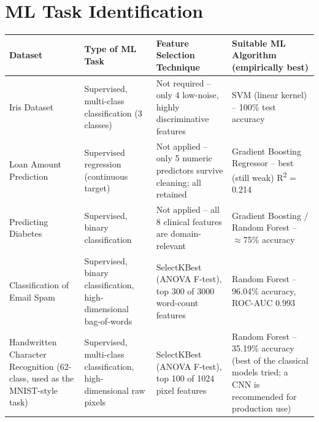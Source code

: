 \documentclass[12pt,a4paper]{article}
\begin{document}
\section{ML Task Identification}
 
\begingroup
\small
\begin{longtable}{|p{2.7cm}|p{2.3cm}|p{3.6cm}|p{3.9cm}|}
\hline
\textbf{Dataset} & \textbf{Type of ML Task} & \textbf{Feature Selection Technique} & \textbf{Suitable ML Algorithm (empirically best)} \\
\hline
\endhead
Iris Dataset & Supervised, multi-class classification (3 classes) & Not required -- only 4 low-noise, highly discriminative features & SVM (linear kernel) -- 100\% test accuracy \\
\hline
Loan Amount Prediction & Supervised regression (continuous target) & Not applied -- only 5 numeric predictors survive cleaning; all retained & Gradient Boosting Regressor -- best (still weak) R\textsuperscript{2} = 0.214 \\
\hline
Predicting Diabetes & Supervised, binary classification & Not applied -- all 8 clinical features are domain-relevant & Gradient Boosting / Random Forest -- $\approx$75\% accuracy \\
\hline
Classification of Email Spam & Supervised, binary classification, high-dimensional bag-of-words & SelectKBest (ANOVA F-test), top 300 of 3000 word-count features & Random Forest -- 96.04\% accuracy, ROC-AUC 0.993 \\
\hline
Handwritten Character Recognition (62-class, used as the MNIST-style task) & Supervised, multi-class classification, high-dimensional raw pixels & SelectKBest (ANOVA F-test), top 100 of 1024 pixel features & Random Forest -- 35.19\% accuracy (best of the classical models tried; a CNN is recommended for production use) \\
\hline
\end{longtable}
\endgroup
 
\end{document}
